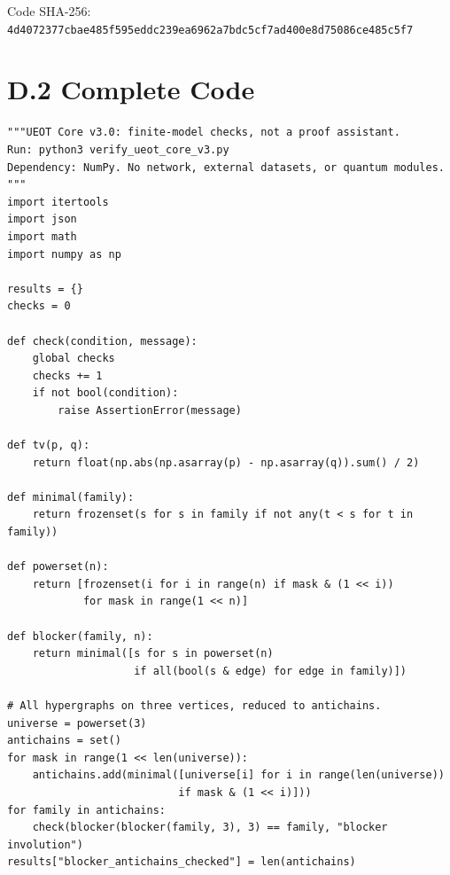 \documentclass[
  english,
  11pt,
  oneside]{book}
\begin{document}
Code SHA-256: \nolinkurl{4d4072377cbae485f595eddc239ea6962a7bdc5cf7ad400e8d75086ce485c5f7}

\section{D.2 Complete Code}\label{d.2-complete-code}

\begin{verbatim}
"""UEOT Core v3.0: finite-model checks, not a proof assistant.
Run: python3 verify_ueot_core_v3.py
Dependency: NumPy. No network, external datasets, or quantum modules.
"""
import itertools
import json
import math
import numpy as np

results = {}
checks = 0

def check(condition, message):
    global checks
    checks += 1
    if not bool(condition):
        raise AssertionError(message)

def tv(p, q):
    return float(np.abs(np.asarray(p) - np.asarray(q)).sum() / 2)

def minimal(family):
    return frozenset(s for s in family if not any(t < s for t in family))

def powerset(n):
    return [frozenset(i for i in range(n) if mask & (1 << i))
            for mask in range(1 << n)]

def blocker(family, n):
    return minimal([s for s in powerset(n)
                    if all(bool(s & edge) for edge in family)])

# All hypergraphs on three vertices, reduced to antichains.
universe = powerset(3)
antichains = set()
for mask in range(1 << len(universe)):
    antichains.add(minimal([universe[i] for i in range(len(universe))
                           if mask & (1 << i)]))
for family in antichains:
    check(blocker(blocker(family, 3), 3) == family, "blocker involution")
results["blocker_antichains_checked"] = len(antichains)


\end{verbatim}
\end{document}
